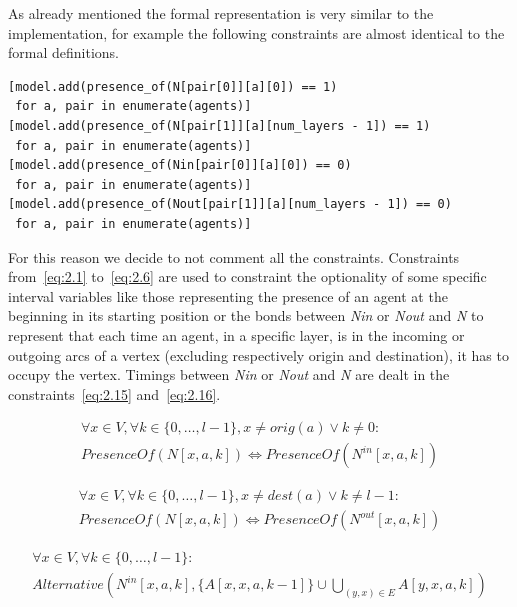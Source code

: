 \documentclass[12pt, a4paper, hidelinks]{article}
\numberwithin{equation}{section}
\begin{document}
As already mentioned the formal representation is very similar to the implementation, for example the following constraints are almost identical to the formal definitions.

\begin{lstlisting}[label={lst:eq2.1-2.4}]
[model.add(presence_of(N[pair[0]][a][0]) == 1)
 for a, pair in enumerate(agents)]
[model.add(presence_of(N[pair[1]][a][num_layers - 1]) == 1)
 for a, pair in enumerate(agents)]
[model.add(presence_of(Nin[pair[0]][a][0]) == 0)
 for a, pair in enumerate(agents)]
[model.add(presence_of(Nout[pair[1]][a][num_layers - 1]) == 0)
 for a, pair in enumerate(agents)]
\end{lstlisting}

For this reason we decide to not comment all the constraints.
Constraints from~\ref{eq:2.1} to~\ref{eq:2.6} are used to constraint the optionality of some specific interval variables like those representing the presence of an agent at the beginning in its starting position or the bonds between \textit{Nin} or \textit{Nout} and \textit{N} to represent that each time an agent, in a specific layer, is in the incoming or outgoing arcs of a vertex (excluding respectively origin and destination), it has to occupy the vertex.
Timings between \textit{Nin} or \textit{Nout} and \textit{N} are dealt in the constraints~\ref{eq:2.15} and~\ref{eq:2.16}.

\begin{description}\label{eq:equation_set_2.2}
\item \begin{equation}\begin{split} \forall x \in V, \forall k \in \{0,\dots,l-1\}, x \neq orig(a) \lor k \neq 0: \\ PresenceOf(N[x,a,k]) \iff PresenceOf(N^{in}[x,a,k]) \end{split}\label{eq:2.5}\end{equation}
\item \begin{equation}\begin{split} \forall x \in V, \forall k \in \{0,\dots,l-1\}, x \neq dest(a) \lor k \neq l-1: \\ PresenceOf(N[x,a,k]) \iff PresenceOf(N^{out}[x,a,k]) \end{split}\label{eq:2.6}\end{equation}
\item \begin{equation}\begin{split} \forall x \in V, \forall k \in \{0,\dots,l-1\}: \\ Alternative(N^{in}[x,a,k], \{A[x,x,a,k-1]\} \cup \bigcup_{(y,x) \in E} A[y,x,a,k]) \end{split}\label{eq:2.7}\end{equation}
\end{description}
\end{document}
